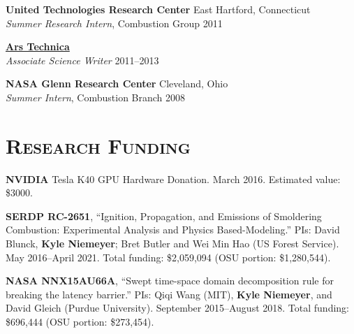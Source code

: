\documentclass[margin,line,11pt]{res}
\begin{document}
\begin{resume}
\textbf{United Technologies Research Center} \hfill East Hartford, Connecticut \\
\emph{Summer Research Intern}, Combustion Group \hfill 2011

\textbf{\href{http://arstechnica.com/}{Ars Technica}} \\
\emph{Associate Science Writer} \hfill 2011--2013

\textbf{NASA Glenn Research Center} \hfill Cleveland, Ohio \\
\emph{Summer Intern}, Combustion Branch \hfill 2008

\section{\textsc{Research Funding}}

\textbf{NVIDIA} Tesla K40 GPU Hardware Donation. March 2016. Estimated value: \$3000.

\textbf{SERDP RC-2651}, ``Ignition, Propagation, and Emissions of Smoldering Combustion: Experimental Analysis and Physics Based-Modeling.'' PIs: David Blunck, \textbf{Kyle Niemeyer}; Bret Butler and Wei Min Hao (US Forest Service). May 2016--April 2021. Total funding: \$2,059,094 (OSU portion: \$1,280,544).

\textbf{NASA NNX15AU66A}, ``Swept time-space domain decomposition rule for breaking the latency barrier.'' PIs: Qiqi Wang (MIT), \textbf{Kyle Niemeyer}, and David Gleich (Purdue University). September 2015--August 2018. Total funding: \$696,444 (OSU portion: \$273,454).


\end{resume}
\end{document}
